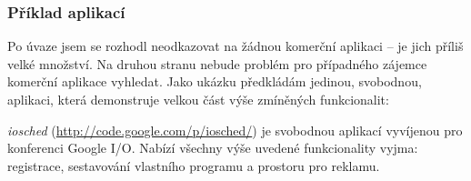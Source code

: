 \subsubsection{Příklad aplikací}
Po úvaze jsem se rozhodl neodkazovat na žádnou komerční aplikaci -- je jich příliš velké množství. Na druhou stranu nebude problém pro případného zájemce komerční aplikace vyhledat. Jako ukázku předkládám jedinou, svobodnou, aplikaci, která demonstruje velkou část výše zmíněných funkcionalit:

\textit{iosched} (\url{http://code.google.com/p/iosched/}) je svobodnou aplikací vyvíjenou pro konferenci Google I/O. Nabízí všechny výše uvedené funkcionality vyjma: registrace, sestavování vlastního programu a prostoru pro reklamu.

